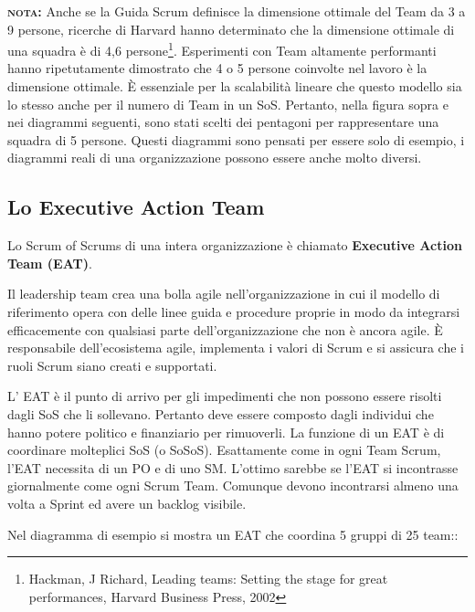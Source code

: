 \documentclass[12pt,a4paper,parskip=full]{scrartcl}
\begin{document}
\textbf{\textsc{nota:}} Anche se la Guida Scrum definisce la dimensione ottimale del Team da 3 a 9 persone, ricerche di Harvard hanno determinato che la dimensione ottimale di una  squadra è di 4,6 persone\footnote{Hackman, J Richard, Leading teams: Setting the stage for
great performances, Harvard Business Press, 2002}. Esperimenti con Team altamente performanti hanno ripetutamente dimostrato che 4 o 5 persone coinvolte nel lavoro è la dimensione ottimale. È essenziale per la scalabilità lineare che questo modello sia lo stesso anche per il numero di Team in un SoS. Pertanto, nella figura sopra e nei diagrammi seguenti, sono stati scelti dei pentagoni per rappresentare una squadra di 5 persone. Questi diagrammi sono pensati per essere solo di esempio, i diagrammi reali di una organizzazione possono essere anche molto diversi.

\subsection{Lo Executive Action Team}
Lo Scrum of Scrums di una intera organizzazione è chiamato \textbf{Executive Action Team (EAT)}. 

Il leadership team crea una bolla agile nell'organizzazione in cui il modello di riferimento opera con delle linee guida e procedure proprie in modo da integrarsi efficacemente con qualsiasi parte dell'organizzazione che non è ancora agile. È responsabile dell'ecosistema agile, implementa i valori di Scrum e si assicura che i ruoli Scrum siano creati e supportati.

L' EAT è il punto di arrivo per gli impedimenti che non possono essere risolti dagli SoS che li sollevano. Pertanto deve essere composto dagli individui che hanno potere politico e finanziario per rimuoverli. La funzione di un EAT è di coordinare molteplici SoS (o SoSoS). Esattamente come in ogni Team Scrum, l'EAT necessita di un PO e di uno SM. L'ottimo sarebbe se l'EAT si incontrasse giornalmente come ogni Scrum Team. Comunque devono incontrarsi almeno una volta a Sprint ed avere un backlog visibile.

Nel diagramma di esempio si mostra un EAT che coordina 5 gruppi di 25 team::
\end{document}
